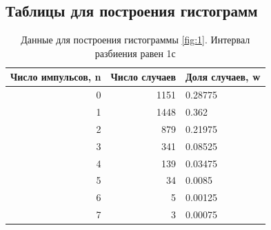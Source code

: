 \documentclass[12pt]{article}
\begin{document}
\subsection{Таблицы для построения гистограмм}\label{sec:app_2}
\begin{table}[H]
    \begin{center}
        \begin{tabular}{|r|r|l|}
            \hline
            Число импульсов, n & Число случаев & Доля случаев, w \\
            \hline
            0                  & 1151          & 0.28775         \\
            1                  & 1448          & 0.362           \\
            2                  & 879           & 0.21975         \\
            3                  & 341           & 0.08525         \\
            4                  & 139           & 0.03475         \\
            5                  & 34            & 0.0085          \\
            6                  & 5             & 0.00125         \\
            7                  & 3             & 0.00075         \\
            \hline
        \end{tabular}
    \end{center}
    \caption{Данные для построения гистограммы \ref{fig:1}. Интервал разбиения равен 1с}
    \label{tab:6}
\end{table}
\end{document}
